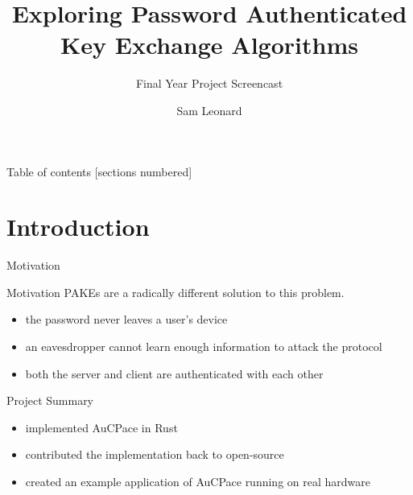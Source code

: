 \documentclass[hyperref={pdfpagemode=FullScreen}, aspectratio=169, 10pt]{beamer}
\title{Exploring Password Authenticated Key Exchange Algorithms}
\subtitle{Final Year Project Screencast}
\author{Sam Leonard}
\institute{Supervisor: Bernardo Magri}
\date{}
\newcommand{\cmark}{\ding{51}}%
\begin{document}
\maketitle

\begin{frame}{Table of contents}
  [sections numbered]
  \tableofcontents%
\end{frame}

\section[Intro]{Introduction}

\begin{frame}{Motivation}
  \begin{figure}[H]
    \centering
  \end{figure}
\end{frame}

\begin{frame}{Motivation}
  PAKEs are a radically different solution to this problem.
  \begin{itemize}
    \item{the password never leaves a user's device}
    \item{an eavesdropper cannot learn enough information to attack the protocol}
    \item{both the server and client are authenticated with each other}
  \end{itemize}
\end{frame}

\begin{frame}{Project Summary}

  \begin{itemize}
    \item{implemented AuCPace in Rust}
    \item{contributed the implementation back to open-source}
    \item{created an example application of AuCPace running on real hardware}
  \end{itemize}
\end{frame}
\end{document}
